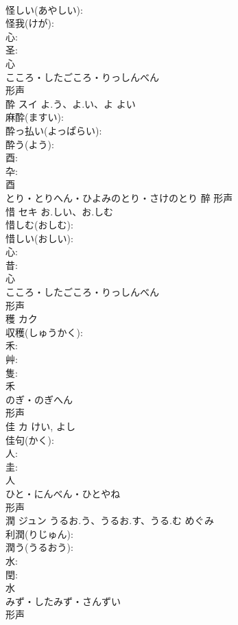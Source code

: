 \documentclass[8pt]{extreport}
\begin{document}
\begin{CJK}{UTF8}{min}
\\	怪しい(あやしい): 
\\	怪我(けが): 
\\	心: 
\\	圣: 
\\	心	
\\	こころ・したごころ・りっしんべん	
\\	形声 
\\	酔	スイ	よ.う、よ.い、よ	よい	
\\	麻酔(ますい): 
\\	酔っ払い(よっぱらい): 
\\	酔う(よう): 
\\	酉: 
\\	卆: 
\\	酉	
\\	とり・とりへん・ひよみのとり・さけのとり	醉	形声 
\\	惜	セキ	お.しい、お.しむ		
\\	惜しむ(おしむ): 
\\	惜しい(おしい): 
\\	心: 
\\	昔: 
\\	心	
\\	こころ・したごころ・りっしんべん	
\\	形声 
\\	穫	カク			
\\	収穫(しゅうかく): 
\\	禾: 
\\	艸: 
\\	隻: 
\\	禾	
\\	のぎ・のぎへん	
\\	形声 
\\	佳	カ		けい, よし	
\\	佳句(かく): 
\\	人: 
\\	圭: 
\\	人	
\\	ひと・にんべん・ひとやね	
\\	形声 
\\	潤	ジュン	うるお.う、うるお.す、うる.む	めぐみ	
\\	利潤(りじゅん): 
\\	潤う(うるおう): 
\\	水: 
\\	閏: 
\\	水	
\\	みず・したみず・さんずい	
\\	形声 

\end{CJK}
\end{document}
